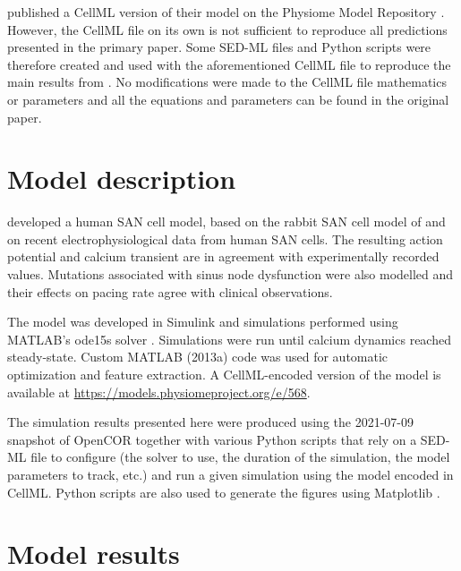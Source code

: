 \documentclass[fleqn,10pt]{physiome}
\begin{document}
\citet{fabbri2017computational} published a CellML version \citep{cuellar2003overview} of their model on the Physiome Model Repository \citep{yu_physiome_2011}. However, the CellML file on its own is not sufficient to reproduce all predictions presented in the primary paper. Some SED-ML files \citep{waltemath2011reproducible} and Python scripts were therefore created and used with the aforementioned CellML file to reproduce the main results from \citet{fabbri2017computational}. No modifications were made to the CellML file mathematics or parameters and all the equations and parameters can be found in the original paper.

\section{Model description}

\citet{fabbri2017computational} developed a human SAN cell model, based on the rabbit SAN cell model of \citet{severi2012updated} and on recent electrophysiological data from human SAN cells. The resulting action potential and calcium transient are in agreement with experimentally recorded values. Mutations associated with sinus node dysfunction were also modelled and their effects on pacing rate agree with clinical observations.

The model was developed in Simulink and simulations performed using MATLAB's ode15s solver \citep{shampine1997matlab}. Simulations were run until calcium dynamics reached steady‐state. Custom MATLAB (2013a) code was used for automatic optimization and feature extraction. A CellML-encoded version of the model is available at \url{https://models.physiomeproject.org/e/568}.

The simulation results presented here were produced using the 2021-07-09 snapshot of OpenCOR \citep{garny2015opencor} together with various Python scripts that rely on a SED-ML file to configure (the solver to use, the duration of the simulation, the model parameters to track, etc.) and run a given simulation using the model encoded in CellML. Python scripts are also used to generate the figures using Matplotlib \citep{Hunter:2007}.

\section{Model results}
\end{document}
